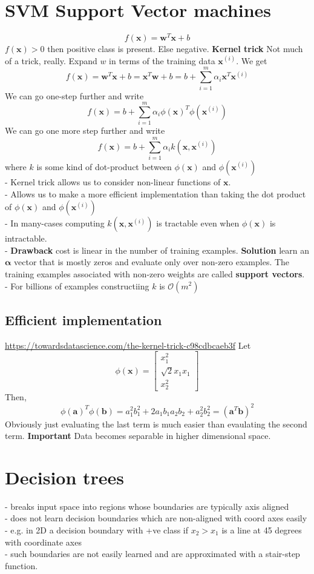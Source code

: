 \documentclass{article}
\newcommand{\beq}{\begin{equation}}
\newcommand{\eeq}{\end{equation}}
\begin{document}
\section{SVM Support Vector machines}
\beq
f(\pmb{x}) = \pmb{w}^T\pmb{x} + b 
\eeq
$f(\pmb{x})>0$ then positive class is present. Else negative.
\textbf{Kernel trick}
Not much of a trick, really. Expand $w$ in terms of the training data $\pmb{x}^{(i)}$. We get
\beq
f(\pmb{x})=\pmb{w}^T\pmb{x} + b = \pmb{x}^T\pmb{w} + b = b + \sum_{i=1}^m\alpha_{i}\pmb{x}^T\pmb{x}^{(i)}
\eeq
We can go one-step further and write
\beq
f(\pmb{x}) = b + \sum_{i=1}^m\alpha_{i}\phi(\pmb{x})^T\phi(\pmb{x}^{(i)})
\eeq
We can go one more step further and write
\beq
f(\pmb{x}) = b + \sum_{i=1}^m\alpha_{i}k(\pmb{x},\pmb{x}^{(i)})
\eeq
where $k$ is some kind of dot-product between $\phi(\pmb{x})$ and $\phi(\pmb{x}^{(i)})$\\
- Kernel trick allows us to consider non-linear functions of $\pmb{x}$.\\
- Allows us to make a more efficient implementation than taking the dot product of $\phi(\pmb{x})$ and $\phi(\pmb{x}^{(i)})$\\
- In many-cases computing $k(\pmb{x},\pmb{x}^{(i)})$ is tractable even when $\phi(\pmb{x})$ is intractable.\\
- \textbf{Drawback} cost is linear in the number of training examples. \textbf{Solution} learn an $\pmb{\alpha}$ vector that is mostly zeros and evaluate only over non-zero examples. The training examples associated with non-zero weights are called \textbf{support vectors}.\\
- For billions of examples constructiing $k$ is $\mathcal{O}(m^2)$
\subsection{Efficient implementation}
\url{https://towardsdatascience.com/the-kernel-trick-c98cdbcaeb3f}
Let
\beq
\phi(\pmb{x}) = \begin{bmatrix} x_1^2\\\sqrt{2}x_1x_1\\x_2^2\end{bmatrix}
\eeq
Then,
\beq
\phi(\pmb{a})^T\phi(\pmb{b}) = a_1^2b_1^2 + 2a_1b_1a_2b_2 + a_2^2b_2^2 = (\pmb{a}^T\pmb{b})^2
\eeq
Obviously just evaluating the last term is much easier than evaulating the second term.
\textbf{Important} Data becomes separable in higher dimensional space.
\section{Decision trees}
- breaks input space into regions whose boundaries are typically axis aligned \\
- does not learn decision boundaries which are non-aligned with coord axes easily\\
- e.g. in 2D a decision boundary with +ve class if $x_2>x_1$ is a line at 45 degrees with coordinate axes\\
- such boundaries are not easily learned and are approximated with a stair-step function.
\end{document}
